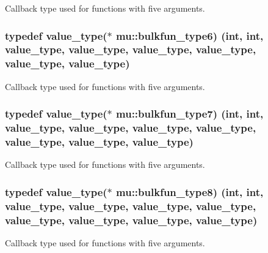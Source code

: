 Callback type used for functions with five arguments. 

\subsubsection[{\texorpdfstring{bulkfun\+\_\+type6}{bulkfun_type6}}]{\setlength{\rightskip}{0pt plus 5cm}typedef {\bf value\+\_\+type}($\ast$ mu\+::bulkfun\+\_\+type6) (int, int, {\bf value\+\_\+type}, {\bf value\+\_\+type}, {\bf value\+\_\+type}, {\bf value\+\_\+type}, {\bf value\+\_\+type}, {\bf value\+\_\+type})}\hypertarget{namespacemu_a1259e71ee6f8b9e3985ef0cda16dd433}{}\label{namespacemu_a1259e71ee6f8b9e3985ef0cda16dd433}


Callback type used for functions with five arguments. 

\subsubsection[{\texorpdfstring{bulkfun\+\_\+type7}{bulkfun_type7}}]{\setlength{\rightskip}{0pt plus 5cm}typedef {\bf value\+\_\+type}($\ast$ mu\+::bulkfun\+\_\+type7) (int, int, {\bf value\+\_\+type}, {\bf value\+\_\+type}, {\bf value\+\_\+type}, {\bf value\+\_\+type}, {\bf value\+\_\+type}, {\bf value\+\_\+type}, {\bf value\+\_\+type})}\hypertarget{namespacemu_a9726be97f12bc3b336884d462623ca8c}{}\label{namespacemu_a9726be97f12bc3b336884d462623ca8c}


Callback type used for functions with five arguments. 

\subsubsection[{\texorpdfstring{bulkfun\+\_\+type8}{bulkfun_type8}}]{\setlength{\rightskip}{0pt plus 5cm}typedef {\bf value\+\_\+type}($\ast$ mu\+::bulkfun\+\_\+type8) (int, int, {\bf value\+\_\+type}, {\bf value\+\_\+type}, {\bf value\+\_\+type}, {\bf value\+\_\+type}, {\bf value\+\_\+type}, {\bf value\+\_\+type}, {\bf value\+\_\+type}, {\bf value\+\_\+type})}\hypertarget{namespacemu_aa4e562060c2c2377266ec1cf274856fe}{}\label{namespacemu_aa4e562060c2c2377266ec1cf274856fe}


Callback type used for functions with five arguments. 

